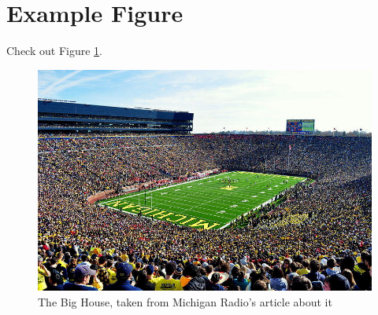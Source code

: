 \section{Example Figure}

Check out Figure \ref{fig:the_big_house}.

\begin{figure}
    \centering
    \includegraphics{example_chapter/figures/the_big_house.jpeg}
    \caption{The Big House, taken from Michigan Radio's article about it \cite{the_big_house}}
    \label{fig:the_big_house}
\end{figure}